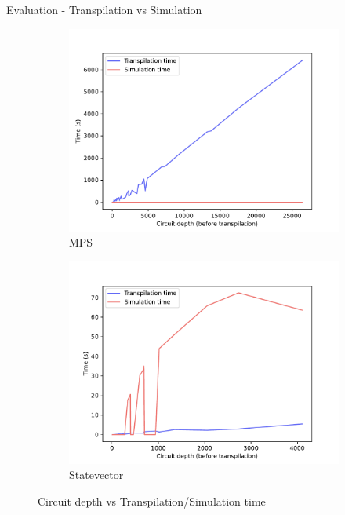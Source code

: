 \documentclass[10pt]{beamer}
\begin{document}
\begin{frame}{Evaluation - Transpilation vs Simulation}
  \begin{figure}
    \begin{subfigure}{0.48\textwidth}
      \centering
      \includegraphics[width=1.1\textwidth]{
          ../src/results/circuit_depth_v_tran_time_and_sim_time-MPS.pdf
      }
      \caption{MPS}
      \label{fig:circuit_depth_v_tran_time_and_sim_time-MPS}
    \end{subfigure}
    \begin{subfigure}{0.48\textwidth}
      \centering
      \includegraphics[width=1.1\textwidth]{
          ../src/results/circuit_depth_v_tran_time_and_sim_time-statevector_cpu.pdf
      }
      \caption{Statevector}
      \label{fig:circuit_depth_v_tran_time_and_sim_time-statevector_cpu}
    \end{subfigure}
    \caption{Circuit depth vs Transpilation/Simulation time}
  \end{figure}
\end{frame}
\end{document}
